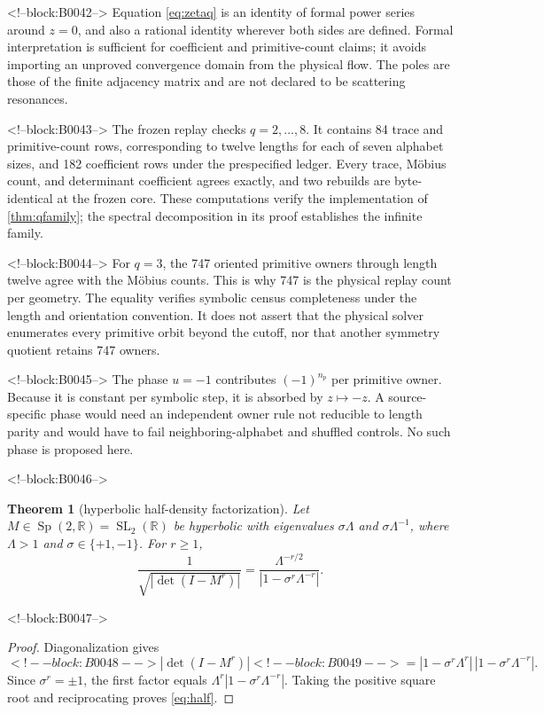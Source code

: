 \documentclass[11pt,a4paper]{article}
\newtheorem{theorem}{Theorem}[section]
\theoremstyle{definition}
\theoremstyle{remark}
\newcommand{\SL}{\operatorname{SL}}
\begin{document}
<!--block:B0042-->
Equation \eqref{eq:zetaq} is an identity of formal power series around \(z=0\), and also a rational identity wherever both sides are defined. Formal interpretation is sufficient for coefficient and primitive-count claims; it avoids importing an unproved convergence domain from the physical flow. The poles are those of the finite adjacency matrix and are not declared to be scattering resonances.

<!--block:B0043-->
The frozen replay checks \(q=2,\ldots,8\). It contains 84 trace and primitive-count rows, corresponding to twelve lengths for each of seven alphabet sizes, and 182 coefficient rows under the prespecified ledger. Every trace, Möbius count, and determinant coefficient agrees exactly, and two rebuilds are byte-identical at the frozen core. These computations verify the implementation of \cref{thm:qfamily}; the spectral decomposition in its proof establishes the infinite family.

<!--block:B0044-->
For \(q=3\), the 747 oriented primitive owners through length twelve agree with the Möbius counts. This is why 747 is the physical replay count per geometry. The equality verifies symbolic census completeness under the length and orientation convention. It does not assert that the physical solver enumerates every primitive orbit beyond the cutoff, nor that another symmetry quotient retains 747 owners.

<!--block:B0045-->
The phase \(u=-1\) contributes \((-1)^{n_p}\) per primitive owner. Because it is constant per symbolic step, it is absorbed by \(z\mapsto-z\). A source-specific phase would need an independent owner rule not reducible to length parity and would have to fail neighboring-alphabet and shuffled controls. No such phase is proposed here.

<!--block:B0046-->
\begin{theorem}[hyperbolic half-density factorization]\label{thm:half}
Let \(M\in\operatorname{Sp}(2,\mathbb R)=\SL_2(\mathbb R)\) be hyperbolic with eigenvalues \(\sigma\Lambda\) and \(\sigma\Lambda^{-1}\), where \(\Lambda>1\) and \(\sigma\in\{+1,-1\}\). For \(r\ge1\),
\begin{equation}\label{eq:half}
 \frac{1}{\sqrt{|\det(I-M^r)|}}
 =\frac{\Lambda^{-r/2}}{|1-\sigma^r\Lambda^{-r}|}.
\end{equation}
\end{theorem}

<!--block:B0047-->
\begin{proof}
Diagonalization gives
\[
<!--block:B0048-->
 |\det(I-M^r)|
<!--block:B0049-->
 =|1-\sigma^r\Lambda^r|\,|1-\sigma^r\Lambda^{-r}|.
\]
Since \(\sigma^r=\pm1\), the first factor equals
\(\Lambda^r|1-\sigma^r\Lambda^{-r}|\). Taking the positive square root and reciprocating proves \cref{eq:half}.
\end{proof}
\end{document}

